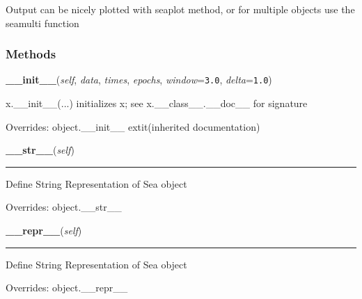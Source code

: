Output can be nicely plotted with seaplot method, or for multiple objects 
use the seamulti function



  \subsubsection{Methods}

    \vspace{0.5ex}

\hspace{.8\funcindent}\begin{boxedminipage}{\funcwidth}

    \raggedright \textbf{\_\_init\_\_}(\textit{self}, \textit{data}, \textit{times}, \textit{epochs}, \textit{window}={\tt 3.0}, \textit{delta}={\tt 1.0})

\setlength{\parskip}{2ex}
    x.\_\_init\_\_(...) initializes x; see x.\_\_class\_\_.\_\_doc\_\_ for 
    signature

\setlength{\parskip}{1ex}
      Overrides: object.\_\_init\_\_ 	extit{(inherited documentation)}

    \end{boxedminipage}

    \vspace{0.5ex}

\hspace{.8\funcindent}\begin{boxedminipage}{\funcwidth}

    \raggedright \textbf{\_\_str\_\_}(\textit{self})

    \vspace{-1.5ex}

    \rule{\textwidth}{0.5\fboxrule}
\setlength{\parskip}{2ex}
    Define String Representation of Sea object

\setlength{\parskip}{1ex}
      Overrides: object.\_\_str\_\_

    \end{boxedminipage}

    \vspace{0.5ex}

\hspace{.8\funcindent}\begin{boxedminipage}{\funcwidth}

    \raggedright \textbf{\_\_repr\_\_}(\textit{self})

    \vspace{-1.5ex}

    \rule{\textwidth}{0.5\fboxrule}
\setlength{\parskip}{2ex}
    Define String Representation of Sea object

\setlength{\parskip}{1ex}
      Overrides: object.\_\_repr\_\_

    \end{boxedminipage}


